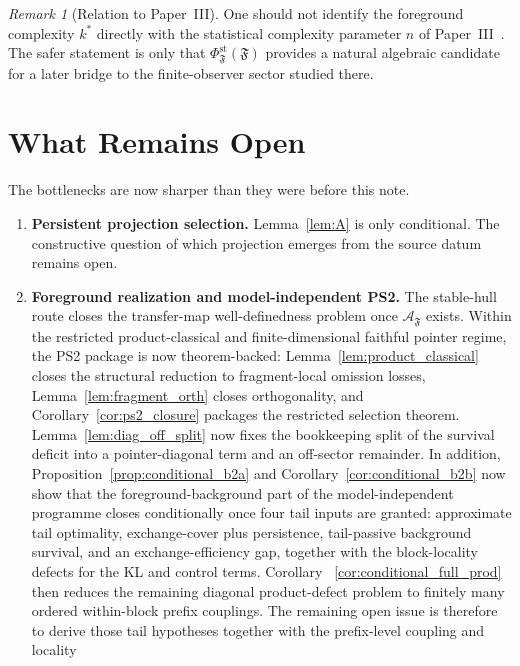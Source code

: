 \documentclass[12pt]{article}
\theoremstyle{definition}
\theoremstyle{remark}
\newtheorem{remark}[theorem]{Remark}
\begin{document}
\begin{remark}[Relation to Paper~III]
One should not identify the foreground complexity \(k^*\) directly with
the statistical complexity parameter \(n\) of Paper~III~\cite{PaperIII}.
The safer statement is only that
\(\Phi_{\mathfrak F}^{\mathrm{st}}(\mathfrak F)\) provides a natural
algebraic candidate for a later bridge to the finite-observer sector
studied there.
\end{remark}

\section{What Remains Open}\label{sec:open}

The bottlenecks are now sharper than they were before this note.

\begin{enumerate}
\item \textbf{Persistent projection selection.} Lemma~\ref{lem:A} is
  only conditional. The constructive question of which projection
  emerges from the source datum remains open.
\item \textbf{Foreground realization and model-independent PS2.} The
  stable-hull route closes the transfer-map well-definedness problem
  once \(\mathcal A_{\mathfrak F}\) exists. Within the restricted
  product-classical and finite-dimensional faithful pointer regime, the
  PS2 package is now theorem-backed:
  Lemma~\ref{lem:product_classical} closes the structural reduction to
  fragment-local omission losses, Lemma~\ref{lem:fragment_orth} closes
  orthogonality, and Corollary~\ref{cor:ps2_closure} packages the
  restricted selection theorem. Lemma~\ref{lem:diag_off_split} now
  fixes the bookkeeping split of the survival deficit into a
  pointer-diagonal term and an off-sector remainder. In addition,
  Proposition~\ref{prop:conditional_b2a} and
  Corollary~\ref{cor:conditional_b2b} now show that the
  foreground-background part of the model-independent programme closes
  conditionally once four tail inputs are granted: approximate tail
  optimality, exchange-cover plus persistence, tail-passive background
  survival, and an exchange-efficiency gap, together with the
  block-locality defects for the KL and control terms. Corollary~
  \ref{cor:conditional_full_prod} then reduces the remaining diagonal
  product-defect problem to finitely many ordered within-block prefix
  couplings. The remaining open issue is therefore to derive those tail
  hypotheses together with the prefix-level coupling and locality

\end{enumerate}
\end{document}
